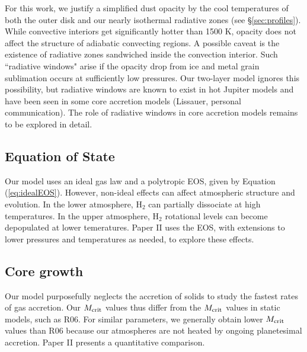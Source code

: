 \documentclass[apj, numberedappendix]{emulateapj}
\newcommand{\Eq}[1]{Equation\,(\ref{#1})}
\newcommand{\MC}{M_{\rm crit}}
\begin{document}
For this work, we justify a simplified dust opacity by the cool temperatures of both the outer disk and our nearly isothermal radiative zones (see \S\ref{sec:profiles}).  While  convective interiors get significantly hotter than 1500 K, opacity does not affect the structure of adiabatic convecting regions.   A possible caveat is the existence of  radiative zones sandwiched inside the convection interior.  Such ``radiative windows" arise if the opacity drop from ice and metal grain sublimation occurs at sufficiently low pressures.  Our two-layer model ignores this possibility, but radiative windows are known to exist in hot Jupiter models \citep{burrows97, ab06} and have been seen in some core accretion models (Lissauer, personal communication).  The role of radiative windows in core accretion models remains to be explored in detail.


\subsection{Equation of State}
\label{sec:EOS}
 
Our model uses an ideal gas law and a polytropic EOS, given by \Eq{eq:idealEOS}.  However, non-ideal effects can affect atmospheric structure and evolution.  In the lower atmosphere, H$_2$ can partially dissociate at high temperatures.  In the upper atmosphere, H$_2$ rotational levels can become depopulated at lower temeratures.   Paper II uses the \citet{saumon95} EOS, with extensions to lower pressures and temperatures as needed, to explore these effects.

\subsection{Core growth}
\label{sec:placc}

Our model purposefully neglects the accretion of solids to study the fastest rates of gas accretion.  Our $\MC$ values thus differ from the $\MC$ values in static models, such as R06.  For similar parameters, we generally obtain lower $\MC$ values than R06 because our atmospheres are not heated by ongoing planetesimal accretion.  Paper II presents a quantitative comparison.



\end{document}
